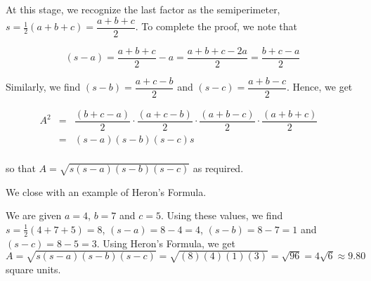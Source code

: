 At this stage, we recognize the last factor as the semiperimeter, $s = \frac{1}{2}(a+b+c) = \dfrac{a+b+c}{2}$.  To complete the proof, we note that

\[ (s - a) = \dfrac{a+b+c}{2} - a = \dfrac{a+b+c-2a}{2} = \dfrac{b+c-a}{2} \]  
			
Similarly, we find $(s-b) = \dfrac{a+c-b}{2}$ and $(s-c) = \dfrac{a+b-c}{2}$.  Hence, we get

\[ \begin{array}{rclr}

A^2 & = & \dfrac{(b+c-a)}{2} \cdot \dfrac{(a+c-b)}{2} \cdot \dfrac{(a+b-c)}{2} \cdot \dfrac{(a+b+c)}{2}  &  \\ [10pt]	 
	 	
	 	& = & (s-a) (s-b) (s-c) s  &  \\ [10pt]	 	
	 	
\end{array} \]

so that  $A = \sqrt{s(s-a)(s-b)(s-c)}$ as required. 

\bigskip

We close with an example of Heron's Formula.

\medskip

{ We are given $a = 4$, $b=7$ and $c = 5$.  Using these values, we find $s = \frac{1}{2}(4+7+5) = 8$, $(s - a) = 8 - 4 = 4$, $(s-b) = 8-7 =1$ and $(s-c) = 8-5=3$. Using Heron's Formula, we get $A = \sqrt{s(s-a)(s-b)(s-c)} = \sqrt{(8)(4)(1)(3)} = \sqrt{96} = 4\sqrt{6} \approx 9.80$ square units.}

